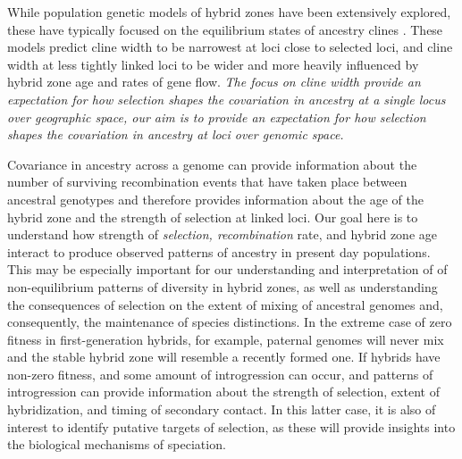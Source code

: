 \documentclass[12pt]{article}
\newcommand{\yb}[1]{{\em \color{magenta} #1}}
\begin{document}
While population genetic models of hybrid zones have been extensively explored, these have typically focused on the equilibrium states of ancestry clines \cite{Barton1979a,Barton1986}. 
These models predict cline width to be narrowest at loci close to selected loci, and cline width at less tightly linked loci to be wider and more heavily influenced by hybrid zone age and rates of gene flow. 
\yb{The focus on cline width provide an expectation for how selection shapes the covariation in ancestry at a single locus over \emph{geographic space}, our aim is to provide an expectation for how selection shapes the covariation in ancestry at loci over \emph{genomic space.}}  

Covariance in ancestry across a genome can provide information about the number of surviving recombination events that have taken place between ancestral genotypes and therefore provides information about the age of the hybrid zone and the strength of selection at linked loci. 
Our goal here is  to understand how strength of \yb{selection, recombination} rate, and hybrid zone age interact to produce observed patterns of ancestry in present day populations.  
This may be especially important for our understanding and interpretation of of non-equilibrium patterns of diversity in hybrid zones, as well as understanding the consequences of selection on the extent of mixing of ancestral genomes and, consequently, the maintenance of species distinctions. In the extreme case of zero fitness in first-generation hybrids, for example, paternal genomes will never mix and the stable hybrid zone will resemble a recently formed one. If hybrids have non-zero fitness, and some amount of introgression can occur, and patterns of introgression can provide information about the strength of selection, extent of hybridization, and timing of secondary contact. In this latter case, it is also of interest to identify putative targets of selection, as these will provide insights into the biological mechanisms of speciation. 
\end{document}
